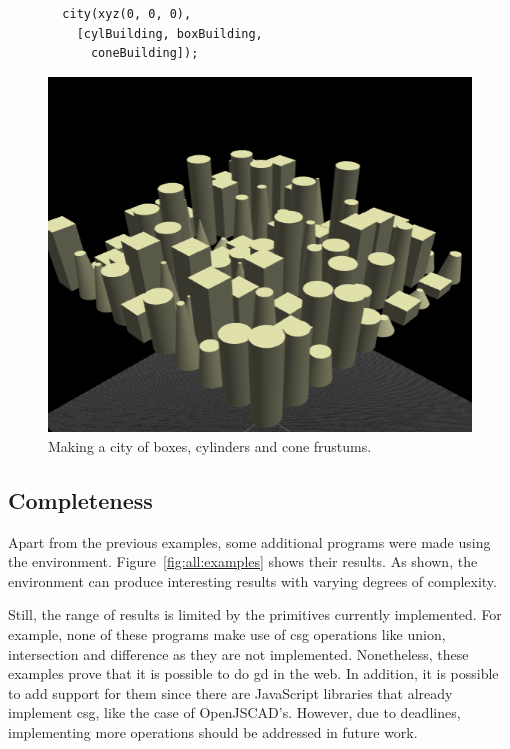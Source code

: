 \begin{figure}
\begin{minipage}{0.5\textwidth}
\begin{verbatim}
  city(xyz(0, 0, 0),
    [cylBuilding, boxBuilding,
      coneBuilding]);
\end{verbatim}
\end{minipage}%
\begin{minipage}{0.5\textwidth}
  \includegraphics[width=1.0\textwidth]{./images/detail_examples/box_cyl_city_higher_crop}
\end{minipage}
\caption{Making a city of boxes, cylinders and cone frustums.}
\label{fig:cyl:box:cone:city}
\end{figure}


\subsection{Completeness}
Apart from the previous examples, some additional programs were made using the environment.
Figure~\ref{fig:all:examples} shows their results.
As shown, the environment can produce interesting results with varying degrees of complexity.

Still, the range of results is limited by the primitives currently implemented.
For example, none of these programs make use of \gls{csg} operations like union, intersection and difference as they are not implemented.
Nonetheless, these examples prove that it is possible to do \gls{gd} in the web.
In addition, it is possible to add support for them since there are JavaScript libraries that already implement \gls{csg}, like the case of OpenJSCAD's.
However, due to deadlines, implementing more operations should be addressed in future work.

